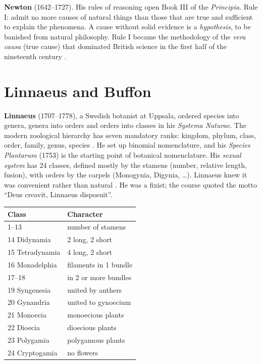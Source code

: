 \textbf{Newton} (1642--1727). His rules of
reasoning open Book III of the
\emph{Principia}. Rule I: admit no more
causes of natural things than those that
are true and sufficient to explain the
phenomena. A cause without solid evidence
is a \emph{hypothesis}, to be banished
from natural philosophy. Rule I became the
methodology of the \emph{vera causa} (true
cause) that dominated British science in
the first half of the nineteenth century
\cite{guillaumin-vera-causa}.

\section{Linnaeus and Buffon}
\label{section-linnaeus-buffon}

\textbf{Linnaeus} (1707--1778), a Swedish
botanist at Uppsala, ordered species into
genera, genera into orders and orders into
classes in his \emph{Systema Naturae}. The
modern zoological hierarchy has seven
mandatory ranks: kingdom, phylum, class,
order, family, genus, species
\cite[Chapter 4]{hickman2002animal}. He set
up binomial nomenclature, and his
\emph{Species Plantarum} (1753) is the
starting point of botanical nomenclature.
His \emph{sexual system} has 24 classes,
defined mostly by the stamens (number,
relative length, fusion), with orders by
the carpels (Monogynia, Digynia, \dots).
Linnaeus knew it was convenient rather than
natural \cite[Chapter 10]{singh2010plant}.
He was a fixist; the course quoted the
motto ``Deus creavit, Linnaeus disposuit''.

\begin{center}
\begin{tabular}{ll}
Class & Character \\
\hline
1--13 & number of stamens \\
14 Didynamia & 2 long, 2 short \\
15 Tetradynamia & 4 long, 2 short \\
16 Monadelphia & filaments in 1 bundle \\
17--18 & in 2 or more bundles \\
19 Syngenesia & united by anthers \\
20 Gynandria & united to gynoecium \\
21 Monoecia & monoecious plants \\
22 Dioecia & dioecious plants \\
23 Polygamia & polygamous plants \\
24 Cryptogamia & no flowers
\end{tabular}
\end{center}

